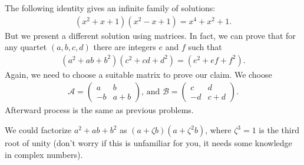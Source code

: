 \documentclass{subfile}
\begin{document}
\begin{solution}
The following identity gives an infinite family of solutions:
\begin{align*}
(x^2+x+1)(x^2-x+1)=x^4+x^2+1.
\end{align*}
But we present a different solution using matrices. In fact, we can prove that for any quartet $(a,b,c,d)$ there are integers $e$ and $f$ such that
\begin{align*}
(a^2+ab+b^2)(c^2+cd+d^2)=(e^2+ef+f^2).
\end{align*}
Again, we need to choose a suitable matrix to prove our claim. We choose 
\begin{align*}
\mathcal{A}=\begin{pmatrix}
a & b\\
-b & a+b
\end{pmatrix}\text{, and }
\mathcal{B}=\begin{pmatrix}
c & d\\
-d & c+d
\end{pmatrix}.
\end{align*}
Afterward process is the same as previous problems.
\end{solution}

\begin{note}
We could factorize $a^2+ab+b^2$ as $(a+\zeta b)(a+\zeta^2b)$, where $\zeta^3=1$ is the third root of unity (don't worry if this is unfamiliar for you, it needs some knowledge in complex numbers).
\end{note}
\end{document}
